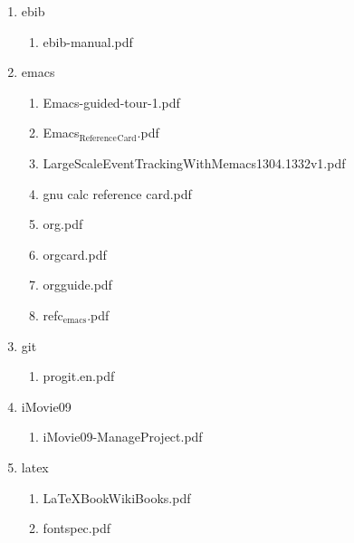 \documentclass[11pt]{article}
\begin{document}
\begin{enumerate}
\item ebib
\label{sec-1-1-1-1-46-5}
\begin{enumerate}
\item ebib-manual.pdf
\label{sec-1-1-1-1-46-5-1}
\end{enumerate}

\item emacs
\label{sec-1-1-1-1-46-6}
\begin{enumerate}
\item Emacs-guided-tour-1.pdf
\label{sec-1-1-1-1-46-6-1}

\item Emacs$_{\text{Reference}}$$_{\text{Card}}$.pdf
\label{sec-1-1-1-1-46-6-2}

\item LargeScaleEventTrackingWithMemacs1304.1332v1.pdf
\label{sec-1-1-1-1-46-6-3}

\item gnu calc reference card.pdf
\label{sec-1-1-1-1-46-6-4}

\item org.pdf
\label{sec-1-1-1-1-46-6-5}

\item orgcard.pdf
\label{sec-1-1-1-1-46-6-6}

\item orgguide.pdf
\label{sec-1-1-1-1-46-6-7}

\item refc$_{\text{emacs}}$.pdf
\label{sec-1-1-1-1-46-6-8}
\end{enumerate}

\item git
\label{sec-1-1-1-1-46-7}
\begin{enumerate}
\item progit.en.pdf
\label{sec-1-1-1-1-46-7-1}
\end{enumerate}

\item iMovie09
\label{sec-1-1-1-1-46-8}
\begin{enumerate}
\item iMovie09-ManageProject.pdf
\label{sec-1-1-1-1-46-8-1}
\end{enumerate}

\item latex
\label{sec-1-1-1-1-46-9}
\begin{enumerate}
\item LaTeXBookWikiBooks.pdf
\label{sec-1-1-1-1-46-9-1}

\item fontspec.pdf
\label{sec-1-1-1-1-46-9-2}


\end{enumerate}
\end{enumerate}
\end{document}
